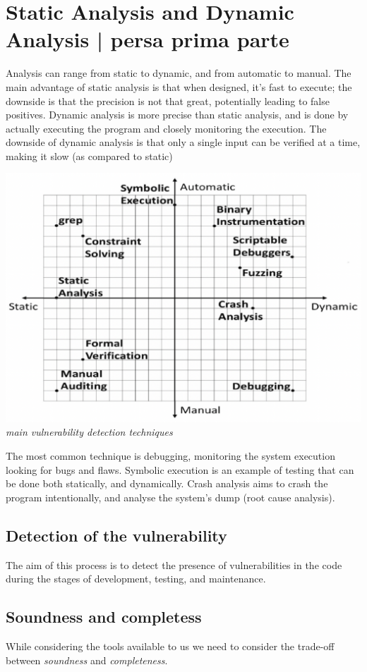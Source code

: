 \documentclass[11pt, oneside]{article}   	%
\begin{document}
\section*{Static Analysis and Dynamic Analysis | persa prima parte}
Analysis can range from static to dynamic, and from automatic to manual. The main advantage of static analysis is that when designed, it's fast to execute; the downside is that the precision is not that great, potentially leading to false positives.  Dynamic analysis is more precise than static analysis, and is done by actually executing the program and closely monitoring the execution. The downside of dynamic analysis is that only a single input can be verified at a time, making it slow (as compared to static)
\begin{center}
\includegraphics[scale = 0.6]{dov}\\
\emph{main vulnerability detection techniques}
\end{center}
The most common technique is debugging, monitoring the system execution looking for bugs and flaws. Symbolic execution is an example of testing that can be done both statically, and dynamically. Crash analysis aims to crash the program intentionally, and analyse the system's dump (root cause analysis).
\subsection*{Detection of the vulnerability}
The aim of this process is to detect the presence of vulnerabilities in the code during the stages of development, testing, and maintenance.
\subsection*{Soundness and completess}
While considering the tools available to us we need to consider the trade-off between \emph{soundness} and \emph{completeness}.\\
\end{document}
